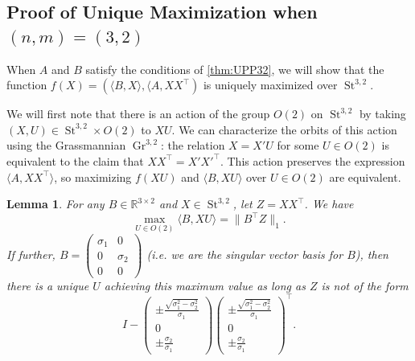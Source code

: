 \documentclass{article}
\numberwithin{equation}{section}
\newcommand{\R}{\mathbb{R}}
\newtheorem{lemma}{Lemma}[section]
\DeclareMathOperator{\St}{St}
\DeclareMathOperator{\Gr}{Gr}
\begin{document}
\subsection{Proof of Unique Maximization when $(n,m) = (3,2)$}
\label{subsec:UPP32}
When $A$ and $B$ satisfy the conditions of \cref{thm:UPP32}, we will show that the function $f(X) = (\langle B, X\rangle, \langle A, XX^{\intercal})$ is uniquely maximized over $\St^{3,2}.$

We will first note that there is an action of the group $O(2)$ on $\St^{3,2}$ by taking $(X,U) \in \St^{3,2} \times O(2)$ to $X U$.
We can characterize the orbits of this action using the Grassmannian $\Gr^{3,2}$: the relation $X = X'U$ for some $U \in O(2)$ is equivalent to the claim that $XX^{\intercal} = X'X'^{\intercal}$.
This action preserves the expression $\langle A, XX^{\intercal}\rangle$, so maximizing $f(X U)$ and $\langle B, XU\rangle $ over $U \in O(2)$ are equivalent.
\begin{lemma}
    \label{lem:stiefel_to_grassmannian}
    For any $B \in \R^{3 \times 2}$ and $X \in \St^{3,2}$, let  $Z = XX^{\intercal}$. We have
\begin{equation}\label{eq:stiefel_to_grassmannian}
    \max_{U \in O(2)} \langle B, XU\rangle = \|B^{\intercal}Z\|_1.
    \end{equation}    
    If further, $B = \begin{pmatrix} \sigma_1 & 0 \\ 0 & \sigma_2 \\ 0 & 0\end{pmatrix}$ (i.e. we are the singular vector basis for $B$), then there is a unique $U$ achieving this maximum value as long as $Z$ is not of the form
    \[
        I -
        \begin{pmatrix}
        \pm \frac{\sqrt{\sigma_1^2 - \sigma_2^2}}{\sigma_1}\\ 0\\\pm \frac{\sigma_2}{\sigma_1}
        \end{pmatrix}
        \begin{pmatrix}
        \pm \frac{\sqrt{\sigma_1^2 - \sigma_2^2}}{\sigma_1}\\ 0\\\pm \frac{\sigma_2}{\sigma_1}
        \end{pmatrix}^{\intercal}.
    \]
\end{lemma}
\end{document}
